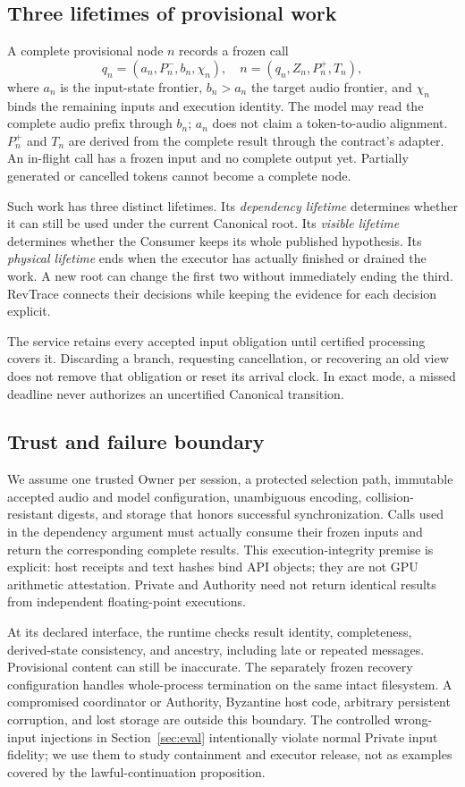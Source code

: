 \subsection{Three lifetimes of provisional work}
A complete provisional node $n$ records a frozen call
\begin{equation}
 q_n=(a_n,P_n^-,b_n,\chi_n),\quad
 n=(q_n,Z_n,P_n^+,T_n),
 \label{eq:node}
\end{equation}
where $a_n$ is the input-state frontier, $b_n>a_n$ the target audio frontier,
and $\chi_n$ binds the remaining inputs and execution identity. The model
may read the complete audio prefix through $b_n$; $a_n$ does not claim a
token-to-audio alignment. $P_n^+$ and $T_n$ are derived from the complete
result through the contract's adapter. An in-flight call has a frozen input
and no complete output yet. Partially generated or cancelled tokens cannot
become a complete node.

Such work has three distinct lifetimes. Its \emph{dependency lifetime}
determines whether it can still be used under the current Canonical root.
Its \emph{visible lifetime} determines whether the Consumer keeps its whole
published hypothesis. Its \emph{physical lifetime} ends when the executor
has actually finished or drained the work. A new root can change the first
two without immediately ending the third. RevTrace connects their decisions
while keeping the evidence for each decision explicit.

The service retains every accepted input obligation until certified
processing covers it. Discarding a branch, requesting cancellation, or
recovering an old view does not remove that obligation or reset its arrival
clock. In exact mode, a missed deadline never authorizes an uncertified
Canonical transition.

\subsection{Trust and failure boundary}
We assume one trusted Owner per session, a protected selection path,
immutable accepted audio and model configuration, unambiguous encoding,
collision-resistant digests, and storage that honors successful
synchronization. Calls used in the dependency argument must actually consume
their frozen inputs and return the corresponding complete results. This
execution-integrity premise is explicit: host receipts and text hashes bind
API objects; they are not GPU arithmetic attestation. Private and Authority
need not return identical results from independent floating-point executions.

At its declared interface, the runtime checks result identity, completeness,
derived-state consistency, and ancestry, including late or repeated messages.
Provisional content can still be inaccurate. The separately frozen recovery configuration
handles whole-process termination on the same intact filesystem.
A compromised coordinator or Authority,
Byzantine host code, arbitrary persistent corruption, and lost storage are
outside this boundary. The controlled wrong-input injections in
Section~\ref{sec:eval} intentionally violate normal Private input fidelity;
we use them to study containment and executor release, not as examples
covered by the lawful-continuation proposition.
